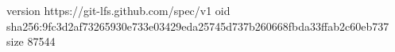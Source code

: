 version https://git-lfs.github.com/spec/v1
oid sha256:9fc3d2af73265930e733e03429eda25745d737b260668fbda33ffab2c60eb737
size 87544
